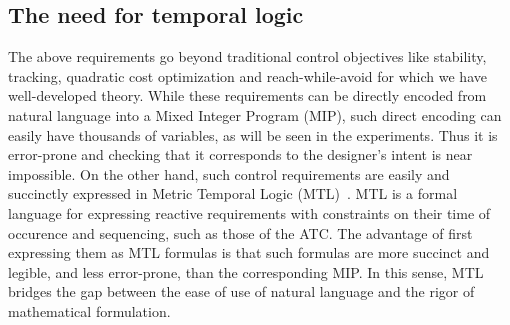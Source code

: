 \subsection{The need for temporal logic}
\label{sec:morari}
The above requirements go beyond traditional control objectives like stability, tracking, quadratic cost optimization and reach-while-avoid for which we have well-developed theory.
While these requirements can be directly encoded from natural language into a Mixed Integer Program (MIP), such direct encoding can easily have thousands of variables, as will be seen in the experiments. 
Thus it is error-prone and checking that it corresponds to the designer's intent is near impossible.
On the other hand, such control requirements are easily and succinctly expressed in Metric Temporal Logic (MTL)~\cite{Koymans90,Ouaknine08_RecentResultsMTL}.
MTL is a formal language for expressing reactive requirements with constraints on their time of occurence and sequencing, such as those of the ATC.
The advantage of first expressing them as MTL formulas is that such formulas are more succinct and legible, and less error-prone, than the corresponding MIP.
In this sense, MTL bridges the gap between the ease of use of natural language and the rigor of mathematical formulation.


